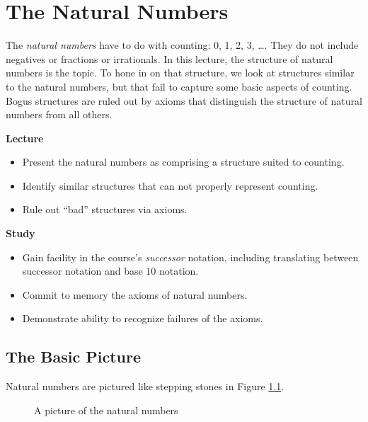 \chapter{The Natural Numbers}

The \emph{natural numbers} have to do with counting: 0, 1, 2, 3, \ldots.
They do not include negatives
or fractions or irrationals.
In this lecture, the structure of natural numbers is the topic.
To hone in on that structure, we look at structures similar to the natural numbers, but that
fail to capture some basic aspects of counting. Bogus structures
are ruled out by axioms that distinguish the structure of natural numbers
from all others.

\begin{goals}
\noindent \textbf{Lecture}
\begin{itemize}
\item Present the natural numbers as comprising a structure suited to counting.
\item Identify similar structures that can not properly represent counting.
\item Rule out ``bad'' structures via axioms.
\end{itemize}

\noindent \textbf{Study}
\begin{itemize}
\item Gain facility in the course's \emph{successor} notation, including
translating between successor notation and base $10$ notation.
\item Commit to memory the axioms of natural numbers.
\item Demonstrate ability to recognize failures of the axioms. 
\end{itemize}
\end{goals}

\section{The Basic Picture}

Natural numbers are pictured like stepping stones in 
Figure \ref{fig:nat-numbers}.

\begin{figure}[h]
  \centering
  \caption{A picture of the natural numbers}
  \label{fig:nat-numbers}
\end{figure}

